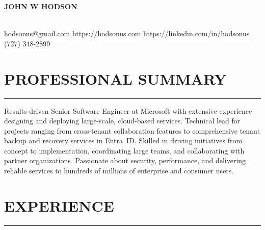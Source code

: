 \documentclass[11pt]{article}
\begin{document}
\noindent
\centerline{\huge \textbf{JOHN W HODSON}}\\[14pt] %
\vspace{0.2cm}
\href{mailto:hodsonus@gmail.com}{hodsonus@gmail.com} \hfill\href{https://hodsonus.com}{https://hodsonus.com} \hfill\href{https://linkedin.com/in/hodsonus}{https://linkedin.com/in/hodsonus} \hfill{(727) 348-2899}

\vspace{0.6cm}
\section*{PROFESSIONAL SUMMARY}
\hrule
\vspace{0.3cm}
\noindent
Results-driven Senior Software Engineer at Microsoft with extensive experience designing and deploying large-scale, cloud-based services. Technical lead for projects ranging from cross-tenant collaboration features to comprehensive tenant backup and recovery services in Entra~ID. Skilled in driving initiatives from concept to implementation, coordinating large teams, and collaborating with partner organizations. Passionate about security, performance, and delivering reliable services to hundreds of millions of enterprise and consumer users.

\vspace{0.6cm}
\section*{EXPERIENCE}
\hrule
\vspace{0.3cm}
\end{document}
